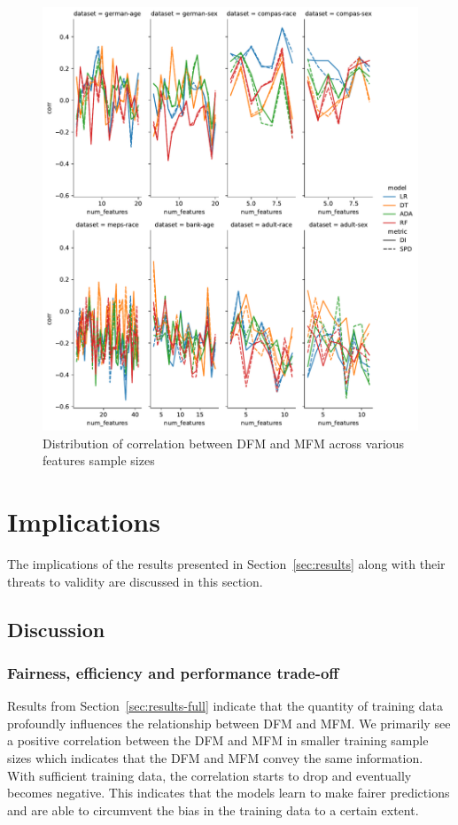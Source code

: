 \documentclass{article}
\begin{document}
\begin{figure}
  \centering
  \includegraphics[width=0.95\linewidth]{lineplot--num-features--corr.pdf}
  \caption{Distribution of correlation between DFM and MFM across
    various features sample sizes}
  \label{fig:lineplot--num-features--corr}
\end{figure}

\section{Implications}\label{sec:implications}
The implications of the results presented in Section \ref{sec:results}
along with their threats to validity are discussed in this section.

\subsection{Discussion}\label{sec:discuss}
\subsubsection{Fairness, efficiency and performance trade-off}\label{sec:discuss-fair-eff-perf-trade}

Results from Section \ref{sec:results-full} indicate that the quantity
of training data profoundly influences the relationship between DFM
and MFM. We primarily see a positive correlation between the DFM and
MFM in smaller training sample sizes which indicates that the DFM and
MFM convey the same information. With sufficient training data, the
correlation starts to drop and eventually becomes negative. This
indicates that the models learn to make fairer predictions and are
able to circumvent the bias in the training data to a certain extent.
\end{document}
